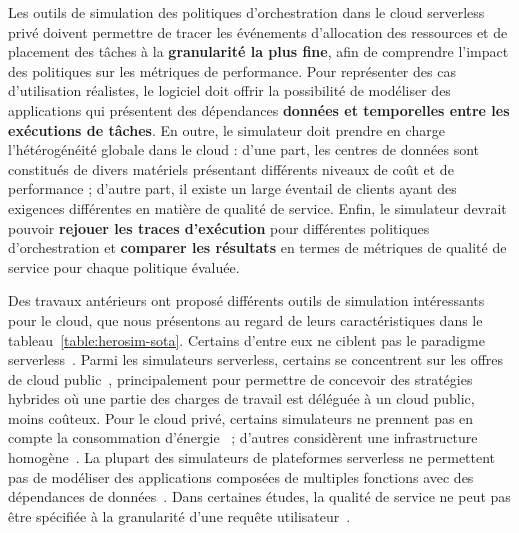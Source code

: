 Les outils de simulation des politiques d'orchestration dans le cloud serverless privé doivent permettre de tracer les événements d'allocation des ressources et de placement des tâches à la \textbf{granularité la plus fine}, afin de comprendre l'impact des politiques sur les métriques de performance. Pour représenter des cas d'utilisation réalistes, le logiciel doit offrir la possibilité de modéliser des applications qui présentent des dépendances \textbf{données et temporelles entre les exécutions de tâches}. En outre, le simulateur doit prendre en charge l'hétérogénéité globale dans le cloud : d'une part, les centres de données sont constitués de divers matériels présentant différents niveaux de coût et de performance ; d'autre part, il existe un large éventail de clients ayant des exigences différentes en matière de qualité de service. Enfin, le simulateur devrait pouvoir \textbf{rejouer les traces d'exécution} pour différentes politiques d'orchestration et \textbf{comparer les résultats} en termes de métriques de qualité de service pour chaque politique évaluée.

Des travaux antérieurs ont proposé différents outils de simulation intéressants pour le cloud, que nous présentons au regard de leurs caractéristiques dans le tableau~\ref{table:herosim-sota}. Certains d'entre eux ne ciblent pas le paradigme serverless~\cite{calheiros_cloudsim_2011, wickremasinghe_cloudanalyst_2010, cai_elasticsim_2017, buyyaGridSimToolkitModeling2002, nunez_icancloud_2012, mahmudIFogSim2ExtendedIFogSim2021}. Parmi les simulateurs serverless, certains se concentrent sur les offres de cloud public~\cite{nunez_icancloud_2012, mahmoudiSimFaaSPerformanceSimulator2021}, principalement pour permettre de concevoir des stratégies hybrides où une partie des charges de travail est déléguée à un cloud public, moins coûteux. Pour le cloud privé, certains simulateurs ne prennent pas en compte la consommation d'énergie~\cite{jeonCloudSimExtensionSimulatingDistributed2019, cai_elasticsim_2017, buyyaGridSimToolkitModeling2002, nunez_icancloud_2012} ; d'autres considèrent une infrastructure homogène~\cite{jeonCloudSimExtensionSimulatingDistributed2019, nunez_icancloud_2012, mahmoudiSimFaaSPerformanceSimulator2021}. La plupart des simulateurs de plateformes serverless ne permettent pas de modéliser des applications composées de multiples fonctions avec des dépendances de données~\cite{calheiros_cloudsim_2011, mampage_cloudsimsc_2023, wickremasinghe_cloudanalyst_2010, jeonCloudSimExtensionSimulatingDistributed2019, buyyaGridSimToolkitModeling2002, nunez_icancloud_2012, mahmudIFogSim2ExtendedIFogSim2021}. Dans certaines études, la qualité de service ne peut pas être spécifiée à la granularité d'une requête utilisateur~\cite{calheiros_cloudsim_2011, mampage_cloudsimsc_2023, wickremasinghe_cloudanalyst_2010, cai_elasticsim_2017, nunez_icancloud_2012, mahmudIFogSim2ExtendedIFogSim2021, mastenbroekOpenDCConvenientModeling2021, mahmoudiSimFaaSPerformanceSimulator2021}.

